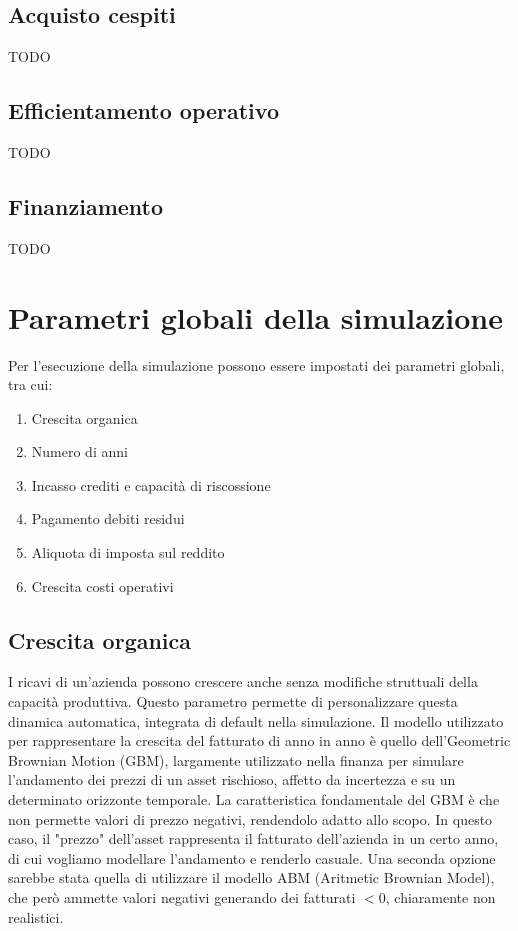 \documentclass{article}
\begin{document}
\subsection{Acquisto cespiti}
TODO

\subsection{Efficientamento operativo}
TODO

\subsection{Finanziamento}
TODO

\section{Parametri globali della simulazione}
Per l'esecuzione della simulazione possono essere impostati dei parametri globali, tra cui:
\begin{enumerate}
    \item \label{item:organic-growth} Crescita organica
    \item Numero di anni
    \item Incasso crediti e capacità di riscossione
    \item Pagamento debiti residui
    \item Aliquota di imposta sul reddito
    \item Crescita costi operativi
\end{enumerate}

\subsection{Crescita organica}
I ricavi di un'azienda possono crescere anche senza modifiche struttuali della capacità produttiva. Questo parametro permette di personalizzare questa dinamica automatica, integrata di default nella simulazione. 
Il modello utilizzato per rappresentare la crescita del fatturato di anno in anno è quello dell'Geometric Brownian Motion (GBM), largamente utilizzato nella finanza per simulare l'andamento dei prezzi di un asset rischioso, affetto da incertezza e su un determinato orizzonte temporale. La caratteristica fondamentale del GBM è che non permette valori di prezzo negativi, rendendolo adatto allo scopo. In questo caso, il "prezzo" dell'asset rappresenta il fatturato dell'azienda in un certo anno, di cui vogliamo modellare l'andamento e renderlo casuale. 
Una seconda opzione sarebbe stata quella di utilizzare il modello ABM (Aritmetic Brownian Model), che però ammette valori negativi  generando dei fatturati $< 0$, chiaramente non realistici. 
\end{document}

